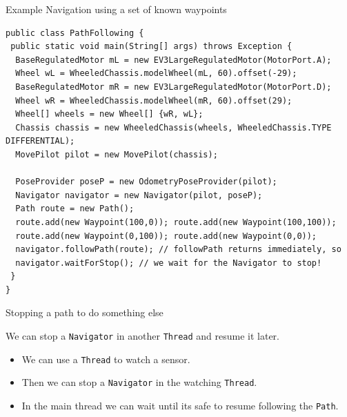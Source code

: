 \documentclass[color=pdftex,usenames,dvipsnames, aspectratio=169]{beamer}
\begin{document}
\begin{frame}[fragile]{Example Navigation using a set of known waypoints}
\vspace*{-3mm}
\begin{lstlisting}[emph={Navigator, nav, Waypoint, Path}, basicstyle=\ttfamily\scriptsize\color{blue}]
public class PathFollowing {
 public static void main(String[] args) throws Exception {
  BaseRegulatedMotor mL = new EV3LargeRegulatedMotor(MotorPort.A);
  Wheel wL = WheeledChassis.modelWheel(mL, 60).offset(-29); 
  BaseRegulatedMotor mR = new EV3LargeRegulatedMotor(MotorPort.D);
  Wheel wR = WheeledChassis.modelWheel(mR, 60).offset(29);
  Wheel[] wheels = new Wheel[] {wR, wL};
  Chassis chassis = new WheeledChassis(wheels, WheeledChassis.TYPE DIFFERENTIAL);
  MovePilot pilot = new MovePilot(chassis);

  PoseProvider poseP = new OdometryPoseProvider(pilot);
  Navigator navigator = new Navigator(pilot, poseP);
  Path route = new Path();
  route.add(new Waypoint(100,0)); route.add(new Waypoint(100,100));
  route.add(new Waypoint(0,100)); route.add(new Waypoint(0,0));
  navigator.followPath(route); // followPath returns immediately, so
  navigator.waitForStop(); // we wait for the Navigator to stop!
 }
}
\end{lstlisting}
\end{frame}

\begin{frame}{Stopping a path to do something else}
\begin{block}{We can stop a \Verb!Navigator! in another \Verb!Thread! and resume it later.}
\begin{itemize}
\item We can use a \lstinline!Thread! to watch a sensor.
\item Then we can stop a \lstinline!Navigator! in the watching \lstinline!Thread!.
\item In the main thread we can wait until its safe to resume following the \lstinline!Path!.
\end{itemize}
\end{block}
\end{frame}
\end{document}
